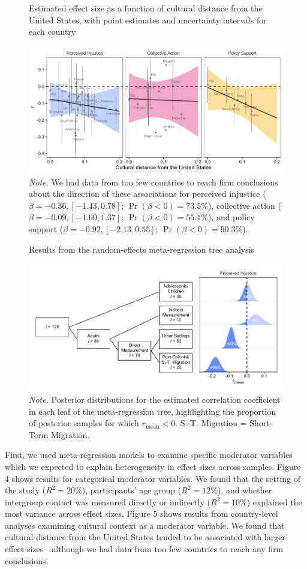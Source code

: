 \documentclass[twocolumn, 11pt, letterpaper]{article}
\begin{document}
\begin{figure}
\centering
\caption{Estimated effect size as a function of cultural distance from the United States, with point estimates and uncertainty intervals for each country}
\includegraphics[scale=1]{../figures/figure-5}
\caption*{\textit{Note.} We had data from too few countries to reach firm conclusions about the direction of these associations for perceived injustice ($\beta = -0.36, [-1.43, 0.78]$; $\Pr (\beta < 0) = 73.5\%$), collective action ($\beta = -0.09, [-1.60, 1.37]$; $\Pr (\beta < 0) = 55.1\%$), and policy support ($\beta = -0.92, [-2.13, 0.55]$; $\Pr (\beta < 0) = 90.3\%$).}
\label{fig:f5}
\end{figure}
\begin{figure}
\centering
\caption{Results from the random-effects meta-regression tree analysis}
\includegraphics[scale=1]{../figures/figure-6}
\caption*{\textit{Note.} Posterior distributions for the estimated correlation coefficient in each leaf of the meta-regression tree, highlighting the proportion of posterior samples for which $r_\text{mean} < 0$.  S.-T. Migration = Short-Term Migration.}
\label{fig:f6}
\end{figure}

First, we used meta-regression models to examine specific moderator
variables which we expected to explain heterogeneity in effect sizes
across samples. Figure 4 shows results for categorical moderator
variables. We found that the setting of the study (\(R^2 = 20\%\)),
participants' age group (\(R^2 = 12\%\)), and whether intergroup contact
was measured directly or indirectly (\(R^2 = 10\%\)) explained the most
variance across effect sizes. Figure 5 shows results from country-level
analyses examining cultural context as a moderator variable. We found
that cultural distance from the United States tended to be associated
with larger effect sizes---although we had data from too few countries
to reach any firm conclusions.
\end{document}
